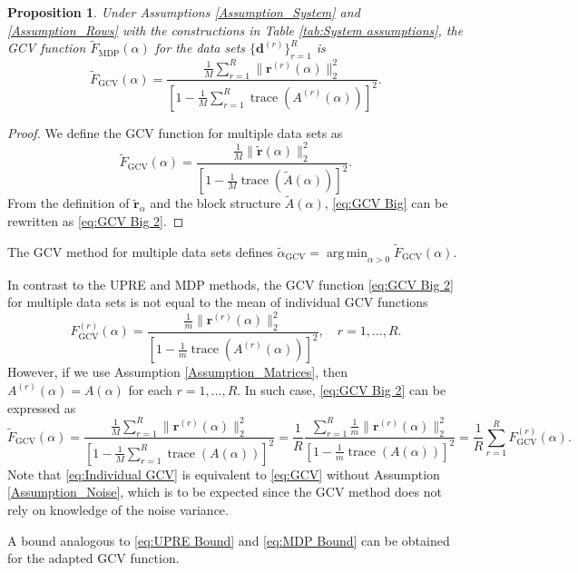 \documentclass[12pt]{article}
\newcommand{\mA}{m}	%
\newcommand{\dVec}{\mathbf{d}}	%
\newcommand{\rVec}{\mathbf{r}}	%
\DeclareMathOperator{\trace}{trace}		%
\newcommand{\regparam}{\alpha}  %
\newcommand{\rBig}{\widetilde{\rVec}}	%
\newcommand{\ABig}{\widetilde{A}}	%
\DeclareMathOperator*{\argmin}{arg\,min}
\newcommand{\A}{A(\regparam)}	%
\newcommand{\G}{F_{\text{GCV}}}	%
\newcommand{\GBig}{\widetilde{F}_{\text{GCV}}}	%
\newcommand{\DBig}{\widetilde{F}_{\text{MDP}}}	%
\newtheorem{proposition}{Proposition}[section]
\begin{document}
\begin{proposition}
Under Assumptions \ref{Assumption_System} and \ref{Assumption_Rows} with the constructions in Table \ref{tab:System assumptions}, the GCV function $\DBig(\regparam)$ for the data sets $\{\dVec^{(r)}\}_{r=1}^R$ is
\begin{equation}
\label{eq:GCV Big 2}
\GBig(\regparam) = \frac{\frac{1}{M}\sum_{r=1}^R \|\rVec^{(r)}(\regparam)\|_2^2}{\left[1 - \frac{1}{M}\sum_{r=1}^R \trace\left(A^{(r)}(\regparam)\right)\right]^2}.
\end{equation}
\end{proposition}
\begin{proof}
We define the GCV function for multiple data sets as
\begin{equation}
\label{eq:GCV Big}
\GBig(\regparam) = \frac{\frac{1}{M}\|\rBig(\regparam)\|_2^2}{\left[1 - \frac{1}{M}\trace\left(\ABig(\regparam)\right)\right]^2}.
\end{equation}
From the definition of $\widetilde{\mathbf{r}}_\regparam$ and the block structure $\ABig(\regparam)$, \eqref{eq:GCV Big} can be rewritten as \eqref{eq:GCV Big 2}.
\end{proof} 
\noindent The GCV method for multiple data sets defines $\widetilde{\regparam}_{\textrm{GCV}} = \argmin_{\regparam > 0} \GBig(\regparam)$. \par 
In contrast to the UPRE and MDP methods, the GCV function \eqref{eq:GCV Big 2} for multiple data sets is not equal to the mean of individual GCV functions
\begin{equation}
\label{eq:Individual GCV}
\G^{(r)}(\regparam) = \frac{\frac{1}{\mA}\|\rVec^{(r)}(\regparam)\|_2^2}{\left[1 - \frac{1}{\mA}\trace\left(A^{(r)}(\regparam)\right)\right]^2}, \quad r = 1,\ldots,R.
\end{equation}
However, if we use Assumption \ref{Assumption_Matrices}, then $A^{(r)}(\regparam) = \A$ for each $r = 1,\ldots,R$. In such case, \eqref{eq:GCV Big 2} can be expressed as
\begin{equation}
\label{eq:Averaged GCV}
\GBig(\regparam) = \frac{\frac{1}{M}\sum_{r=1}^R \|\rVec^{(r)}(\regparam)\|_2^2}{\left[1 - \frac{1}{M}\sum_{r=1}^R \trace\left(\A\right)\right]^2} = \frac{1}{R}\frac{\sum_{r=1}^R \frac{1}{\mA} \|\rVec^{(r)}(\regparam)\|_2^2}{\left[1 - \frac{1}{\mA} \trace\left(\A\right)\right]^2} = \frac{1}{R}\sum_{r=1}^R \G^{(r)}(\regparam).
\end{equation}
Note that \eqref{eq:Individual GCV} is equivalent to \eqref{eq:GCV} without Assumption \ref{Assumption_Noise}, which is to be expected since the GCV method does not rely on knowledge of the noise variance. \par 
A bound analogous to \eqref{eq:UPRE Bound} and \eqref{eq:MDP Bound} can be obtained for the adapted GCV function.
\end{document}
